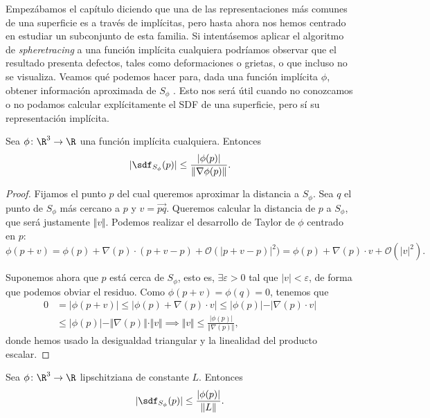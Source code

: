 Empezábamos el capítulo diciendo que una de las representaciones más comunes de una superficie es a través de implícitas, pero hasta ahora nos hemos centrado en estudiar un subconjunto de esta familia. Si intentásemos aplicar el algoritmo de \textit{spheretracing} a una función implícita cualquiera podríamos observar que el resultado presenta defectos, tales como deformaciones o grietas, o que incluso no se visualiza. Veamos qué podemos hacer para, dada una función implícita $\phi$, obtener información aproximada de $S_\phi$ \cite{article:aprox}. Esto nos será útil cuando no conozcamos o no podamos calcular explícitamente el SDF de una superficie, pero sí su representación implícita.

\begin{proposicion}
    Sea $\phi\colon \R^3\to\R$ una función implícita cualquiera. Entonces
    \begin{equation*}    
        \vert \sdf_{S_\phi}(p)\vert \le \frac{\vert \phi(p)\vert}{\Vert \nabla\phi(p)\Vert}.
    \end{equation*}
\end{proposicion}
\begin{proof}
    Fijamos el punto $p$ del cual queremos aproximar la distancia a $S_{\phi}$. Sea $q$ el punto de $S_\phi$ más cercano a $p$ y $v=\vec{pq}$. Queremos calcular la distancia de $p$ a $S_\phi$, que será justamente $\Vert v\Vert$. Podemos realizar el desarrollo de Taylor de $\phi$ centrado en $p$:
    \begin{equation*}
        \phi(p+v) = \phi(p) + \nabla(p)\cdot (p+v -p) + \mathcal{O}(\vert p+v-p)\vert^2) = \phi(p) + \nabla(p)\cdot v + \mathcal{O}(\vert v\vert^2).
    \end{equation*}

    Suponemos ahora que $p$ está cerca de $S_\phi$, esto es, $\exists \varepsilon>0$ tal que  $\vert v\vert < \varepsilon$, de forma que podemos obviar el residuo. Como $\phi(p+v) = \phi(q)=0$, tenemos que
    \begin{align*}
        0 &= \vert \phi(p+v)\vert \le \vert \phi(p) + \nabla(p)\cdot v \vert \le \vert \phi(p)\vert - \vert \nabla(p)\cdot v \vert\\
         &\le \vert \phi(p)\vert - \Vert \nabla(p)\Vert\cdot \Vert v \Vert \implies \Vert v\Vert \le \frac{\vert \phi(p)\vert}{\Vert \nabla(p)\Vert},
    \end{align*}
    donde hemos usado la desigualdad triangular y la linealidad del producto escalar.
\end{proof}
\begin{corolario}
    Sea $\phi\colon \R^3\to \R$ lipschitziana de constante $L$. Entonces
    \begin{equation*}    
        \vert \sdf_{S_\phi}(p)\vert \le \frac{\vert \phi(p)\vert}{\Vert L\Vert}.
    \end{equation*}
\end{corolario}

